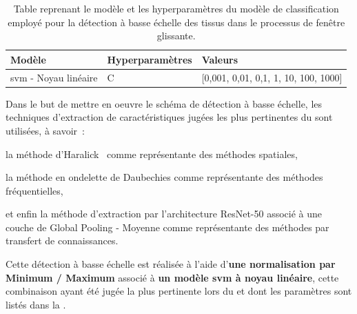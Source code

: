 \begin{table}[H]
    \centering
    \begin{tabular}{lll}
        \toprule
        \textbf{Modèle}                                 & \textbf{Hyperparamètres}  & \textbf{Valeurs}                          \\ \midrule
        \gls{svm} - Noyau linéaire                      & C                         & [0,001, 0,01, 0,1, 1, 10, 100, 1000]      \\ 
        \bottomrule 
    \end{tabular} 
    \caption{Table reprenant le modèle et les hyperparamètres du modèle de classification employé pour la détection à basse échelle des tissus dans le processus de fenêtre glissante.}
    \label{tab:parameters_image_improvement_sliding_window_models}
\end{table}\par

Dans le but de mettre en oeuvre le schéma de détection à basse échelle, les techniques d'extraction de caractéristiques jugées les plus pertinentes du  sont utilisées, à savoir~:~
\begin{inlinerate}
    \item la méthode d'Haralick~ comme représentante des méthodes spatiales,
    \item la méthode en ondelette de Daubechies comme représentante des méthodes fréquentielles,
    \item et enfin la méthode d'extraction par l'architecture ResNet-50 associé à une couche de Global Pooling - Moyenne comme représentante des méthodes par transfert de connaissances.
\end{inlinerate} Cette détection à basse échelle est réalisée à l'aide d'\textbf{une normalisation par Minimum / Maximum} associé à \textbf{un modèle \gls{svm} à noyau linéaire}, cette combinaison ayant été jugée la plus pertinente lors du  et dont les paramètres sont listés dans la .\par

